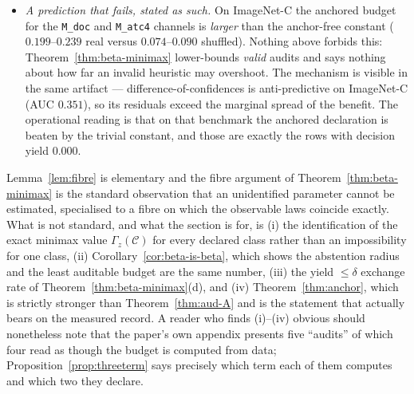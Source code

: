 \begin{remark}
\begin{itemize}
uninformative anchor leaves only a class-scale constant. Under the global label permutation
of \texttt{adversarial\_ablations.py}, any estimator fit on the permuted benefit column
converges to the constant $\E[\Delta]$, so the declaration procedure must return
approximately $q_{0.90}(|\Delta-\E\Delta|)$ --- a number computable from the raw artifacts
with no model fitting. On CIFAR-10-C that prediction is $0.2376$; the six measured shuffled
budgets are $0.2468$--$0.2606$, ratios $1.04$--$1.10$, against real budgets of
$0.0178$--$0.0482$ (inflation $5.2\times$--$14.1\times$), with zero commitments in $5/5$
replicates for the \texttt{M\_doc} and \texttt{M\_atc4} channels. On ImageNet-C the
prediction is $0.0689$ against measured $0.0742$--$0.1171$ (ratios $1.08$--$1.70$; $n=405$).
Script and output: \texttt{kb\_fixes/beta\_impossible/check\_anchor\_collapse.py},
\texttt{anchor\_collapse\_check.json}.
\item \emph{A prediction that fails, stated as such.} On ImageNet-C the anchored budget for
the \texttt{M\_doc} and \texttt{M\_atc4} channels is \emph{larger} than the anchor-free
constant ($0.199$--$0.239$ real versus $0.074$--$0.090$ shuffled). Nothing above forbids
this: Theorem~\ref{thm:beta-minimax} lower-bounds \emph{valid} audits and says nothing about
how far an invalid heuristic may overshoot. The mechanism is visible in the same artifact ---
difference-of-confidences is anti-predictive on ImageNet-C (AUC $0.351$), so its residuals
exceed the marginal spread of the benefit. The operational reading is that on that benchmark
the anchored declaration is beaten by the trivial constant, and those are exactly the rows
with decision yield $0.000$.
\end{itemize}
\end{remark}

\begin{remark}\label{rem:honest-scope}
Lemma~\ref{lem:fibre} is elementary and the fibre argument of
Theorem~\ref{thm:beta-minimax} is the standard observation that an unidentified parameter
cannot be estimated, specialised to a fibre on which the observable laws coincide exactly.
What is not standard, and what the section is for, is (i) the identification of the exact
minimax value $\Gamma_z(\mathcal C)$ for every declared class rather than an impossibility
for one class, (ii) Corollary~\ref{cor:beta-is-beta}, which shows the abstention radius and
the least auditable budget are the same number, (iii) the yield $\le\delta$ exchange rate of
Theorem~\ref{thm:beta-minimax}(d), and (iv) Theorem~\ref{thm:anchor}, which is strictly
stronger than Theorem~\ref{thm:aud-A} and is the statement that actually bears on the
measured record. A reader who finds (i)--(iv) obvious should nonetheless note that the
paper's own appendix presents five ``audits'' of which four read as though the budget is
computed from data; Proposition~\ref{prop:threeterm} says precisely which term each of them
computes and which two they declare.
\end{remark}
